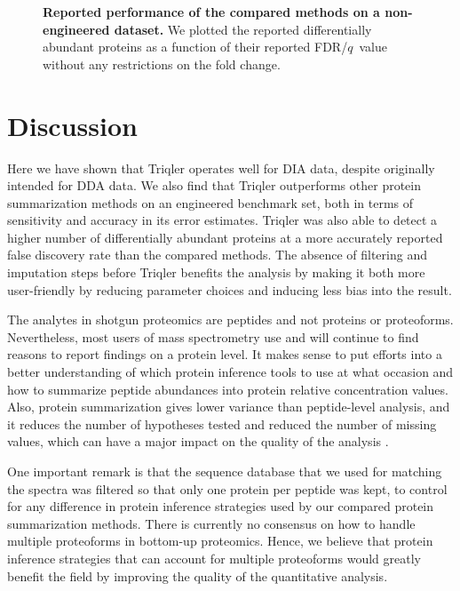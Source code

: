 \documentclass[10pt,letterpaper]{article}
\begin{document}
\begin{figure}[hbt]
    \centering
    \begin{tabular}{c} 
    \end{tabular}
  \caption{{\bf Reported performance of the compared methods on a non-engineered dataset.} We plotted the reported differentially abundant proteins as a function of their reported FDR/$q$~value without any restrictions on the fold change. \label{fig:non-engineered}}
\end{figure}


\section*{Discussion}

Here we have shown that Triqler operates well for DIA data, despite originally intended for DDA data. We also find that Triqler outperforms other protein summarization methods on an engineered benchmark set, both in terms of sensitivity and accuracy in its error estimates. Triqler was also able to detect a higher number of differentially abundant proteins at a more accurately reported false discovery rate than the compared methods. The absence of filtering and imputation steps before Triqler benefits the analysis by making it both more user-friendly by reducing parameter choices and inducing less bias into the result. 

The analytes in shotgun proteomics are peptides and not proteins or proteoforms. Nevertheless, most users of mass spectrometry use and will continue to find reasons to report findings on a protein level. It makes sense to put efforts into a better understanding of which protein inference tools to use at what occasion and how to summarize peptide abundances into protein relative concentration values. Also, protein summarization gives lower variance than peptide-level analysis, and it reduces the number of hypotheses tested and reduced the number of missing values, which can have a major impact on the quality of the analysis \cite{plubell2021can}.   

One important remark is that the sequence database that we used for matching the spectra was filtered so that only one protein per peptide was kept, to control for any difference in protein inference strategies used by our compared protein summarization methods. There is currently no consensus on how to handle multiple proteoforms in bottom-up proteomics. Hence, we believe that protein inference strategies that can account for multiple proteoforms would greatly benefit the field by improving the quality of the quantitative analysis. 
\end{document}
